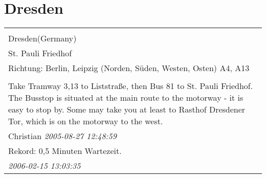 \documentclass[a4paper,12pt]{article}
\begin{document}
\section{Dresden}
\begin{tabular}{|p{13cm}|}
\hline\\
Dresden(Germany)\\
St. Pauli Friedhof\\
Richtung: Berlin, Leipzig (Norden, Süden, Westen, Osten) A4, A13 \\
\hline\\
Take Tramway 3,13 to Liststraße, then Bus 81 to St. Pauli Friedhof. The Busstop is situated at the main route to the motorway - it is easy to stop by. Some may take you at least to Rasthof Dresdener Tor, which is on the motorway to the west. \\
Christian \textit{ 2005-08-27 12:48:59 }\\\hline Rekord: 0,5 Minuten Wartezeit. \\
\textit{ 2006-02-15 13:03:35 }\\\hline
\end{tabular}
\end{document}
